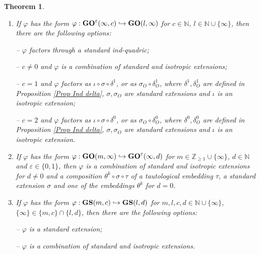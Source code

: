 \documentclass[12pt]{amsart}
\def\NN {{\mathbb N}}     %
\def\ZZ {{\mathbb Z}}     %
\def\hw  {\hookrightarrow}
\newtheorem{theorem}{Theorem}[section]
\begin{document}
\begin{theorem}
\begin{enumerate}
\item[\rm (ii.3)] If $\varphi$ has the form $\varphi:{\bf GO}^\varepsilon(\infty,c) \hookrightarrow {\bf GO}(l,\infty)$ for $c\in\NN$, $l\in\NN\cup\{\infty\}$, then there are the following options:

-- $\varphi$ factors through a standard ind-quadric;

-- $c\ne 0$ and $\varphi$ is a combination of standard and isotropic extensions;

-- $c=1$ and $\varphi$ factors as $\iota\circ\sigma\circ\delta^1$, or as $\sigma_O\circ \delta^1_O$, where $\delta^1,\delta_O^1$ are defined in Proposition \ref{Prop Ind delta}, $\sigma,\sigma_O$ are standard extensions and $\iota$ is an isotropic extension;

-- $c=2$ and $\varphi$ factors as $\iota\circ\sigma\circ\delta^0$, or as $\sigma_O\circ \delta^0_O$, where $\delta^0,\delta_O^0$ are defined in Proposition \ref{Prop Ind delta}, $\sigma,\sigma_O$ are standard extensions and $\iota$ is an isotropic extension.

\item[\rm (ii.4)] If $\varphi$ has the form $\varphi:{\bf GO}(m,\infty)\hw {\bf GO}^\varepsilon(\infty,d)$ for $m\in\ZZ_{\geq1}\cup\{\infty\}$, $d\in\NN$ and $\varepsilon\in\{0,1\}$, then $\varphi$ is a combination of standard and isotropic extensions for $d\ne 0$ and a composition $\theta^k\circ\sigma\circ\tau$ of a tautological embedding $\tau$, a standard extension $\sigma$ and one of the embeddings $\theta^k$ for $d=0$.

\item[\rm (iii)] If $\varphi$ has the form $\varphi:{\bf GS}(m,c) \hookrightarrow {\bf GS}(l,d)$ for $m,l,c,d\in\NN\cup\{\infty\}$, $\{\infty\}\in\{m,c\}\cap\{l,d\}$, then there are the following options: 

-- $\varphi$ is a standard extension;

-- $\varphi$ is a combination of standard and isotropic extensions.
\end{enumerate}
\end{theorem}
\end{document}
